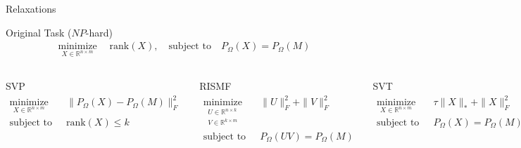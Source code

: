 \documentclass{beamer}
\begin{document}
\begin{frame}{Relaxations}
	\begin{block}{Original Task ($NP$-hard)}
		\vspace{-0.2cm}
		\begin{align*}
		\mathop{\text{minimize}}\limits_{X \in \mathbb{R}^{n \times m}} \quad 
		\text{rank} (X), \quad 
		\text{subject to} \quad P_{\Omega} (X) = P_{\Omega} (M)
		\end{align*}
	\end{block}
	\vspace{0.3cm}
	\footnotesize
	\begin{columns}[c]
	\begin{block}{SVP}
		\vspace{-0.3cm}
		\begin{align*}
		\mathop{\text{minimize}}\limits_{X \in \mathbb{R}^{n \times m}} \quad & 
		\| P_{\Omega} (X) - P_{\Omega} (M) \|_F^2 \\
		\text{subject to} \quad & \text{rank} (X) \leq k
		\end{align*}
	\end{block}
	
	
	\begin{block}{RISMF}
		\vspace{-0.3cm}
		\begin{align*}
		\mathop{\text{minimize}}\limits_{\substack{	U \in \mathbb{R}^{n \times k} \\ V \in \mathbb{R}^{k \times m}}} \quad & \| U \|^2_F + \| V \|^2_F \\
		\text{subject to} \quad &  P_{\Omega} (UV) = P_{\Omega} (M) 
		\end{align*}
	\end{block}
	\begin{block}{SVT}
		\vspace{-0.3cm}
		\begin{align*}
		\mathop{\text{minimize}}\limits_{X \in \mathbb{R}^{n \times m}} \quad & \tau \| X \|_* + \| X \|_F^2 \\
		\text{subject to} \quad & P_{\Omega} (X) = P_{\Omega} (M)
		\end{align*}
	\end{block}
	\begin{block}{SoftImpute}
		\vspace{-0.3cm}
		\begin{align*}
		\mathop{\text{minimize}}\limits_{X \in \mathbb{R}^{n \times m}} \quad & 
		\| X \|_* \\
		\text{subject to} \quad & \| P_{\Omega} (X) - P_{\Omega} (M) \|_F \leq \delta
		\end{align*}
	\end{block}
\end{columns}
	
\end{frame}
\end{document}
